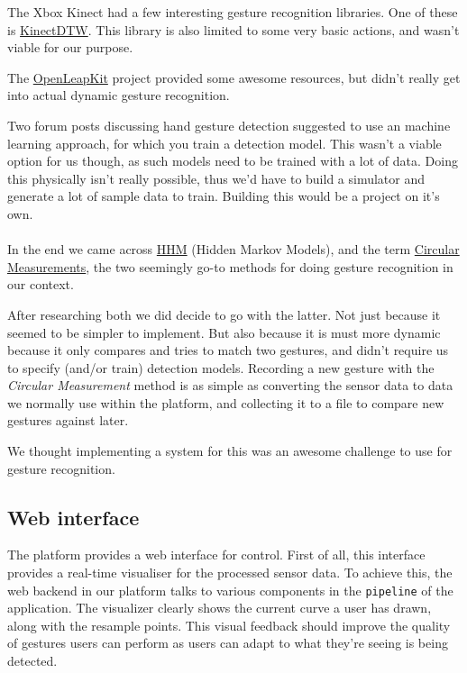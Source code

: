 \documentclass{standalone}
\begin{document}
  The Xbox Kinect had a few interesting gesture recognition libraries. One of
  these is \href{https://archive.codeplex.com/?p=kinectdtw}{KinectDTW}. This
  library is also limited to some very basic actions, and wasn't viable for our
  purpose.

  The
  \href{https://forums.leapmotion.com/t/openleapkit-updated-leap-motion-controller-toolkit-for-common-needs/289}{OpenLeapKit}
  project provided some awesome resources, but didn't really get into actual
  dynamic gesture recognition.

  Two forum posts discussing hand gesture detection suggested to use an machine
  learning approach, for which you train a detection model. This wasn't a viable
  option for us though, as such models need to be trained with a lot of data.
  Doing this physically isn't really possible, thus we'd have to build a
  simulator and generate a lot of sample data to train. Building this would be a
  project on it's own.

  \paragraph{}
  In the end we came across
  \href{http://www.creativedistraction.com/demos/gesture-recognition-kinect-with-hidden-markov-models-hmms/}{HHM}
  (Hidden Markov Models), and the term
  \href{http://delivery.acm.org/10.1145/3140000/3134139/p12-balcazar.pdf}{Circular
  Measurements}, the two seemingly go-to methods for doing gesture recognition
  in our context.

  After researching both we did decide to go with the latter.
  Not just because it seemed to be simpler to implement. But also because it is
  must more dynamic because it only compares and tries to match two gestures,
  and didn't require us to specify (and/or train) detection models.
  Recording a new gesture with the \emph{Circular Measurement} method is as
  simple as converting the sensor data to data we normally use within the
  platform, and collecting it to a file to compare new gestures against later.

  We thought implementing a system for this was an awesome challenge to use for
  gesture recognition.

  \subsection{Web interface}
  The platform provides a web interface for control. First of all, this
  interface provides a real-time visualiser for the processed sensor data. To
  achieve this, the web backend in our platform talks to various components in
  the \verb_pipeline_ of the application. The visualizer clearly shows the
  current curve a user has drawn, along with the resample points. This visual
  feedback should improve the quality of gestures users can perform as users
  can adapt to what they're seeing is being detected.
\end{document}
